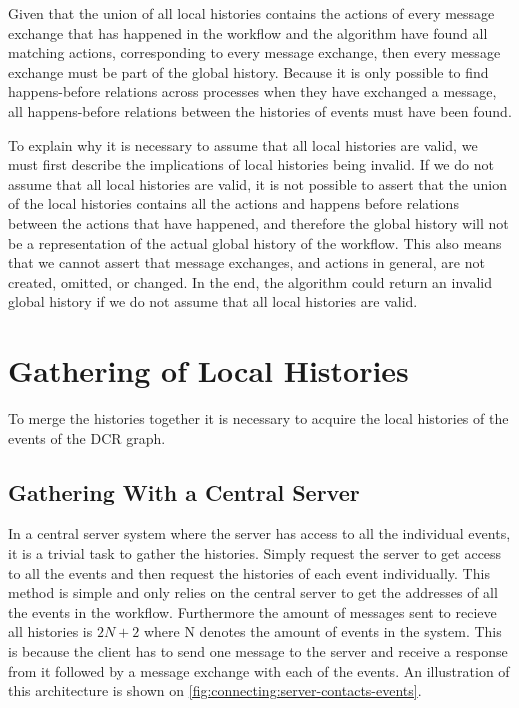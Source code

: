     \newpar Given that the union of all local histories contains the actions of every message exchange that has happened in the workflow and the algorithm have found all matching actions, corresponding to every message exchange, then every message exchange must be part of the global history. Because it is only possible to find happens-before relations across processes when they have exchanged a message, all happens-before relations between the histories of events must have been found.
    
    \newpar To explain why it is necessary to assume that all local histories are valid, we must first describe the implications of local histories being invalid. If we do not assume that all local histories are valid, it is not possible to assert that the union of the local histories contains all the actions and happens before relations between the actions that have happened, and therefore the global history will not be a representation of the actual global history of the workflow. This also means that we cannot assert that message exchanges, and actions in general, are not created, omitted, or changed. In the end, the algorithm could return an invalid global history if we do not assume that all local histories are valid.

    \section{Gathering of Local Histories}
    To merge the histories together it is necessary to acquire the local histories of the events of the DCR graph.
    \subsection{Gathering With a Central Server}
    In a central server system where the server has access to all the individual events, it is a trivial task to gather the histories. Simply request the server to get access to all the events and then request the histories of each event individually. This method is simple and only relies on the central server to get the addresses of all the events in the workflow. Furthermore the amount of messages sent to recieve all histories is $2N+2$ where N denotes the amount of events in the system. This is because the client has to send one message to the server and receive a response from it followed by a message exchange with each of the events. An illustration of this architecture is shown on \autoref{fig:connecting:server-contacts-events}.
    
